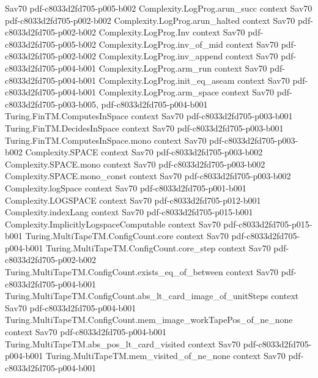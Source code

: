 \begin{theorem}
  {Sav70}
  {pdf-c8033d2fd705-p005-b002}
\proofstep
  {Complexity.LogProg.arun_succ}
  {context}
  {Sav70}
  {pdf-c8033d2fd705-p002-b002}
\proofstep
  {Complexity.LogProg.arun_halted}
  {context}
  {Sav70}
  {pdf-c8033d2fd705-p002-b002}
\proofstep
  {Complexity.LogProg.Inv}
  {context}
  {Sav70}
  {pdf-c8033d2fd705-p005-b002}
\proofstep
  {Complexity.LogProg.inv_of_mid}
  {context}
  {Sav70}
  {pdf-c8033d2fd705-p002-b002}
\proofstep
  {Complexity.LogProg.inv_append}
  {context}
  {Sav70}
  {pdf-c8033d2fd705-p004-b001}
\proofstep
  {Complexity.LogProg.arm_run}
  {context}
  {Sav70}
  {pdf-c8033d2fd705-p004-b001}
\proofstep
  {Complexity.LogProg.init_eq_aseam}
  {context}
  {Sav70}
  {pdf-c8033d2fd705-p004-b001}
\proofstep
  {Complexity.LogProg.arm_space}
  {context}
  {Sav70}
  {pdf-c8033d2fd705-p003-b005,
    pdf-c8033d2fd705-p004-b001}
\proofstep
  {Turing.FinTM.ComputesInSpace}
  {context}
  {Sav70}
  {pdf-c8033d2fd705-p003-b001}
\proofstep
  {Turing.FinTM.DecidesInSpace}
  {context}
  {Sav70}
  {pdf-c8033d2fd705-p003-b001}
\proofstep
  {Turing.FinTM.ComputesInSpace.mono}
  {context}
  {Sav70}
  {pdf-c8033d2fd705-p003-b002}
\proofstep
  {Complexity.SPACE}
  {context}
  {Sav70}
  {pdf-c8033d2fd705-p003-b002}
\proofstep
  {Complexity.SPACE.mono}
  {context}
  {Sav70}
  {pdf-c8033d2fd705-p003-b002}
\proofstep
  {Complexity.SPACE.mono_const}
  {context}
  {Sav70}
  {pdf-c8033d2fd705-p003-b002}
\proofstep
  {Complexity.logSpace}
  {context}
  {Sav70}
  {pdf-c8033d2fd705-p001-b001}
\proofstep
  {Complexity.LOGSPACE}
  {context}
  {Sav70}
  {pdf-c8033d2fd705-p012-b001}
\proofstep
  {Complexity.indexLang}
  {context}
  {Sav70}
  {pdf-c8033d2fd705-p015-b001}
\proofstep
  {Complexity.ImplicitlyLogspaceComputable}
  {context}
  {Sav70}
  {pdf-c8033d2fd705-p015-b001}
\proofstep
  {Turing.MultiTapeTM.ConfigCount.core}
  {context}
  {Sav70}
  {pdf-c8033d2fd705-p004-b001}
\proofstep
  {Turing.MultiTapeTM.ConfigCount.core_step}
  {context}
  {Sav70}
  {pdf-c8033d2fd705-p002-b002}
\proofstep
  {Turing.MultiTapeTM.ConfigCount.exists_eq_of_between}
  {context}
  {Sav70}
  {pdf-c8033d2fd705-p004-b001}
\proofstep
  {Turing.MultiTapeTM.ConfigCount.abs_lt_card_image_of_unitSteps}
  {context}
  {Sav70}
  {pdf-c8033d2fd705-p004-b001}
\proofstep
  {Turing.MultiTapeTM.ConfigCount.mem_image_workTapePos_of_ne_none}
  {context}
  {Sav70}
  {pdf-c8033d2fd705-p004-b001}
\proofstep
  {Turing.MultiTapeTM.abs_pos_lt_card_visited}
  {context}
  {Sav70}
  {pdf-c8033d2fd705-p004-b001}
\proofstep
  {Turing.MultiTapeTM.mem_visited_of_ne_none}
  {context}
  {Sav70}
  {pdf-c8033d2fd705-p004-b001}

\end{theorem}
